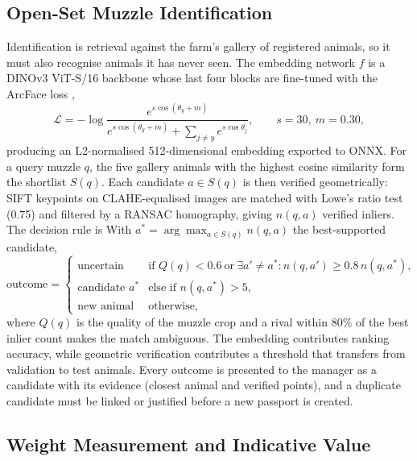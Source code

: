\documentclass[11pt,letterpaper]{article}
\begin{document}
\subsection{Open-Set Muzzle Identification}

Identification is retrieval against the farm's gallery of registered animals, so it must also recognise animals it has never seen. The embedding network $f$ is a DINOv3 ViT-S/16 backbone \cite{simeoni2025dinov3} whose last four blocks are fine-tuned with the ArcFace loss \cite{deng2019arcface},
\begin{equation}
\mathcal{L} = -\log \frac{e^{s\cos(\theta_{y}+m)}}{e^{s\cos(\theta_{y}+m)} + \sum_{j\neq y} e^{s\cos\theta_{j}}}, \qquad s = 30,\ m = 0.30,
\end{equation}
producing an L2-normalised 512-dimensional embedding exported to ONNX. For a query muzzle $q$, the five gallery animals with the highest cosine similarity form the shortlist $S(q)$. Each candidate $a \in S(q)$ is then verified geometrically: SIFT keypoints on CLAHE-equalised images are matched with Lowe's ratio test (0.75) and filtered by a RANSAC homography, giving $n(q,a)$ verified inliers. The decision rule is
With $a^{*} = \arg\max_{a \in S(q)} n(q,a)$ the best-supported candidate,
\begin{equation}
\text{outcome} =
\begin{cases}
\text{uncertain} & \text{if } Q(q) < 0.6 \ \text{or}\ \exists a' \neq a^{*}: n(q,a') \ge 0.8\, n(q,a^{*}),\\
\text{candidate } a^{*} & \text{else if } n(q,a^{*}) > 5,\\
\text{new animal} & \text{otherwise,}
\end{cases}
\end{equation}
where $Q(q)$ is the quality of the muzzle crop and a rival within 80\% of the best inlier count makes the match ambiguous.
The embedding contributes ranking accuracy, while geometric verification contributes a threshold that transfers from validation to test animals. Every outcome is presented to the manager as a candidate with its evidence (closest animal and verified points), and a duplicate candidate must be linked or justified before a new passport is created.

\subsection{Weight Measurement and Indicative Value}
\end{document}
